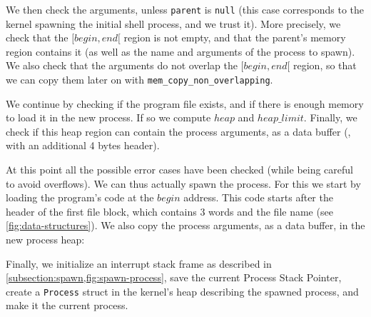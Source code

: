 We then check the arguments, unless {\tt parent} is {\tt null} (this case
corresponds to the kernel spawning the initial shell process, and we trust it).
More precisely, we check that the $[\mathit{begin}, \mathit{end}[$ region is
not empty, and that the parent's memory region contains it (as well as the name
and arguments of the process to spawn). We also check that the arguments do not
overlap the $[\mathit{begin}, \mathit{end}[$ region, so that we can copy them
later on with {\tt mem\_copy\_non\_overlapping}.


We continue by checking if the program file exists, and if there is enough
memory to load it in the new process. If so we compute $\mathit{heap}$ and
$\mathit{heap\_limit}$. Finally, we check if this heap region can contain the
process arguments, as a data buffer (\ie, with an additional 4 bytes header).


At this point all the possible error cases have been checked (while being
careful to avoid overflows). We can thus actually spawn the process. For this
we start by loading the program's code at the $\mathit{begin}$ address. This
code starts after the header of the first file block, which contains 3 words
and the file name (see \cref{fig:data-structures}). We also copy the process
arguments, as a data buffer, in the new process heap:


Finally, we initialize an interrupt stack frame as described in
\cref{subsection:spawn,fig:spawn-process}, save the current Process Stack
Pointer, create a {\tt Process} struct in the kernel's heap describing the
spawned process, and make it the current process.

